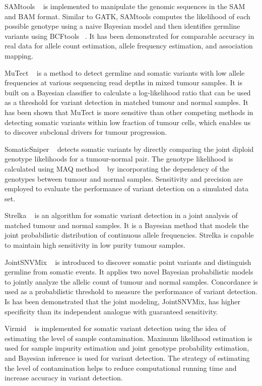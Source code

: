 \documentclass[11pt,reqno]{amsart}
\begin{document}
SAMtools ~\citep{Li2009a} is implemented to manipulate the genomic sequences in the SAM and BAM format.
Similar to GATK, SAMtools computes the likelihood of each possible genotype using a naive Bayesian model and then identifies germline variants using BCFtools ~\citep{li2011statistical}.
It has been demonstrated for comparable accuracy in real data for allele count estimation, allele frequency estimation, and association mapping.

MuTect ~\citep{Cibulskis2013} is a method to detect germline and somatic variants with low allele frequencies at various sequencing read depths in mixed tumour samples.
It is built on a Bayesian classifier to calculate a log-likelihood ratio that can be used as a threshold for variant detection in matched tumour and normal samples.
It has been shown that MuTect is more sensitive than other competing methods in detecting somatic variants within low fraction of tumour cells, which enables us to discover subclonal drivers for tumour progression.

SomaticSniper ~\citep{Larson2012} detects somatic variants by directly comparing the joint diploid genotype likelihoods for a tumour-normal pair.
The genotype likelihood is calculated using MAQ method ~\citep{Li2008} by incorporating the dependency of the genotypes between tumour and normal samples.
Sensitivity and precision are employed to evaluate the performance of variant detection on a simulated data set.

Strelka ~\citep{Saunders2012} is an algorithm for somatic variant detection in a joint analysis of matched tumour and normal samples.
It is a Bayesian method that models the joint probabilistic distribution of continuous allele frequencies.
Strelka is capable to maintain high sensitivity in low purity tumour samples.

JointSNVMix ~\citep{Roth2012} is introduced to discover somatic point variants and distinguish germline from somatic events.
It applies two novel Bayesian probabilistic models to jointly analyze the allelic count of tumour and normal samples.
Concordance is used as a probabilistic threshold to measure the performance of variant detection.
Is has been demonstrated that the joint modeling, JointSNVMix, has higher specificity than its independent analogue with guaranteed sensitivity.

Virmid ~\citep{Kim2013} is implemented for somatic variant detection using the idea of estimating the level of sample contamination.
Maximum likelihood estimation is used for sample impurity estimation and joint genotype probability estimation, and Bayesian inference is used for variant detection.
The strategy of estimating the level of contamination helps to reduce computational running time and increase accuracy in variant detection.
\end{document}
